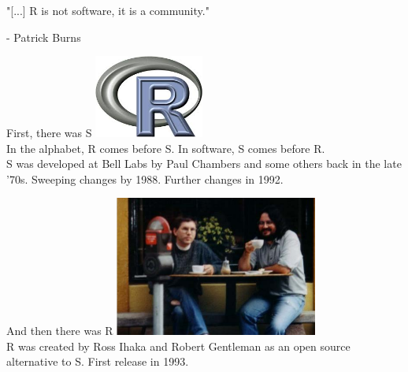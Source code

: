 \documentclass[xcolor=dvipsnames]{beamer}
\begin{document}
\begin{frame}
  "[...] R is not software, it is a community."
  
  - Patrick Burns
\end{frame}

\begin{frame}{First, there was S}
  \includegraphics[width=0.27\textwidth]{../Part1/figure/R}
  \\
  In the alphabet, R comes before S. In software, S comes before R.
  \\
  S was developed at Bell Labs by Paul Chambers and some others back in the late '70s. Sweeping changes by 1988. Further changes in 1992.
\end{frame}

\begin{frame}{And then there was R}
  \includegraphics[width=0.5\textwidth]{../Part1/figure/RossAndRobert}
  \\
  R was created by Ross Ihaka and Robert Gentleman as an open source alternative to S. First release in 1993.
\end{frame}
\end{document}
